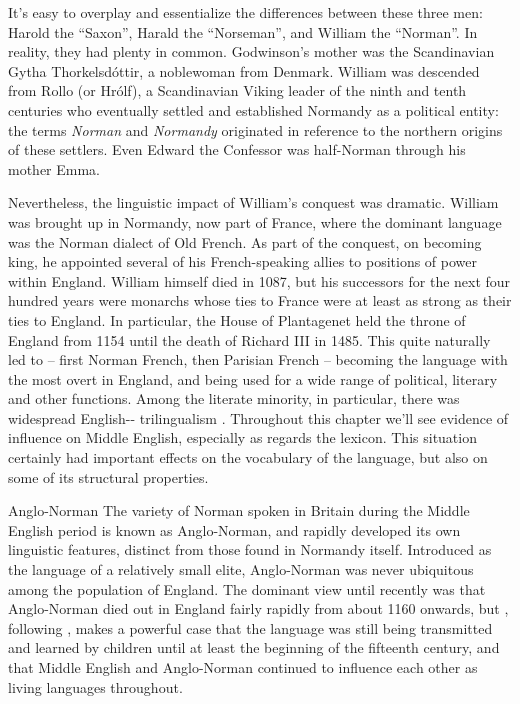 \noindent It's easy to overplay and essentialize the differences between these three men: Harold the ``Saxon'', Harald the ``Norseman'', and William the ``Norman''. In reality, they had plenty in common. Godwinson's mother was the Scandinavian Gytha Thorkelsdóttir, a noblewoman from Denmark. William was descended from Rollo (or Hrólf), a Scandinavian Viking leader of the ninth and tenth centuries who eventually settled and established Normandy as a political entity: the terms \emph{Norman} and \emph{Normandy} originated in reference to the northern origins of these settlers. Even Edward the Confessor was half-Norman through his mother Emma.

Nevertheless, the linguistic impact of William's conquest was dramatic. Wil\-liam was brought up in Normandy, now part of France, where the dominant language was the Norman dialect of Old French. As part of the conquest, on becoming king, he appointed several of his French-speaking allies to positions of power within England. William himself died in 1087, but his successors for the next four hundred years were monarchs whose ties to France were at least as strong as their ties to England. In particular, the House of Plantagenet held the throne of England from 1154 until the death of Richard III in 1485. This quite naturally led to  -- first Norman French, then Parisian French -- becoming the language with the most overt  in England, and being used for a wide range of political, literary and other functions. Among the literate minority, in particular, there was widespread English-- trilingualism \citep[§11.2]{Durkin2014}. Throughout this chapter we'll see evidence of  influence on Middle English, especially as regards the lexicon. This situation certainly had important effects on the vocabulary of the language, but also on some of its structural properties.


\begin{varietybox}{Anglo-Norman}
The variety of Norman  spoken in Britain during the Middle English period is known as Anglo-Norman, and rapidly developed its own linguistic features, distinct from those found in Normandy itself. Introduced as the language of a relatively small elite, Anglo-Norman was never ubiquitous among the population of England. The dominant view until recently was that Anglo-Norman died out in England fairly rapidly from about 1160 onwards, but \citet{Ingham2012}, following \citet{Rothwell2001}, makes a powerful case that the language was still being transmitted and learned by children until at least the beginning of the fifteenth century, and that Middle English and Anglo-Norman continued to influence each other as living languages throughout.
\end{varietybox}


